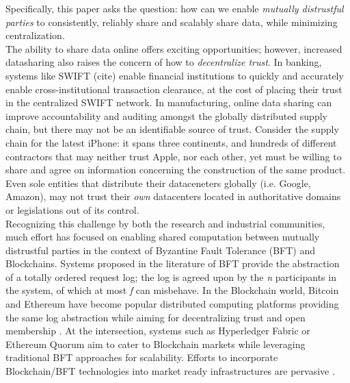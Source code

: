  Specifically, this paper asks the question: how can we enable \textit{mutually distrustful parties} to consistently, reliably share and scalably share data, while minimizing centralization. \\


The ability to share data online offers exciting opportunities; however, increased datasharing also raises the concern of how to \textit{decentralize trust}. In banking, systems like SWIFT (cite) enable financial institutions to quickly and accurately enable cross-institutional transaction clearance, at the cost of placing their trust in the centralized SWIFT network. In manufacturing, online data sharing can improve accountability and auditing amongst the globally distributed supply chain, but there may not be an identifiable source of trust. Consider the supply chain for the latest iPhone: it spans three continents, and hundreds of different contractors \cite{AppleSup} that may neither trust Apple, nor each other, yet must be willing to share and agree on information concerning the construction of the same product. Even sole entities that distribute their dataceneters globally (i.e. Google, Amazon), may not trust their \textit{own} datacenters located in authoritative domains or legislations out of its control.\\


Recognizing this challenge by both the research and industrial communities, much effort has focused on enabling shared computation  between mutually distrustful parties in the context of Byzantine Fault Tolerance (BFT) and Blockchains. 
Systems proposed in the literature of BFT provide the abstraction of a totally ordered request log; the log is agreed upon by the \textit{n} participants in the system, of which at most \textit{f} can misbehave. In the Blockchain world, Bitcoin and Ethereum have become popular distributed computing platforms providing the same log abstraction while aiming for decentralizing trust and open membership . At the intersection, systems such as Hyperledger Fabric \cite{Hyperledger} or Ethereum Quorum \cite{EthereumQuorum} aim to cater to Blockchain markets while leveraging traditional BFT approaches for scalability. Efforts to incorporate Blockchain/BFT technologies into market ready infrastructures are pervasive \cite{StateFarmQuorum, AutoInventory, StateFarmQuorum2, HyperledgerTelecom, HyperledgerHealth}. \\


